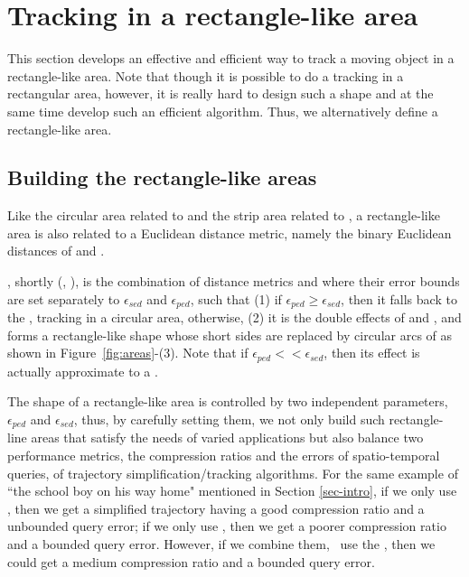 

\section{Tracking in a rectangle-like area}
\label{sec:rectangle}

This section develops an effective and efficient way to track a moving object in a rectangle-like area. Note that though it is possible to do a tracking in a rectangular area, however, it is really hard to design such a shape and at the same time develop such an efficient algorithm. Thus, we alternatively define a rectangle-like area.


\subsection{Building the rectangle-like areas}

Like the circular area related to \sed and the strip area related to \ped, a rectangle-like area is also related to a Euclidean distance metric, namely the binary Euclidean distances of \sed and \ped.

, shortly \bed (\sed, \ped), is the combination of distance metrics \sed and \ped where their error bounds are set separately to $\epsilon_{sed}$ and $\epsilon_{ped}$, such that (1) if $\epsilon_{ped} \ge \epsilon_{sed}$, then it falls back to the \sed, \ie tracking in a circular area, otherwise, (2) it is the double effects of \ped and \sed, and forms a rectangle-like shape whose short sides are replaced by circular arcs of \sed as shown in {Figure~\ref{fig:areas}-(3)}. Note that if $\epsilon_{ped} << \epsilon_{sed}$, then its effect is actually approximate to a \ped.

The shape of a rectangle-like area is controlled by two independent parameters, $\epsilon_{ped}$ and $\epsilon_{sed}$, thus, by carefully setting them, we not only build such rectangle-line areas that satisfy the needs of varied applications but also balance two performance metrics, the compression ratios and the errors of spatio-temporal queries, of trajectory simplification/tracking algorithms. 
For the same example of ``the school boy on his way home" mentioned in Section \ref{sec-intro}, if we only use \ped, then we get a simplified trajectory having a good compression ratio and a unbounded query error; if we only use \sed, then we get a poorer compression ratio and a bounded query error. However, if we combine them, \ie~use the \bed, then we could get a medium compression ratio and a bounded query error.



